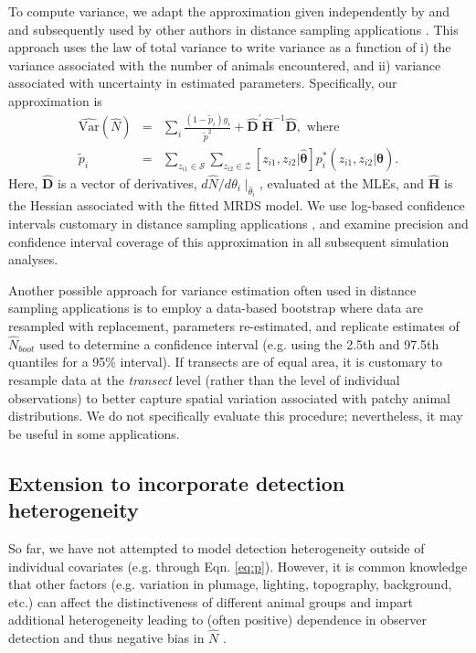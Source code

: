 \documentclass[aoas,preprint]{imsart}
\numberwithin{equation}{section}
\theoremstyle{plain}
\begin{document}
To compute variance, we adapt the approximation given independently by \citet{Huggins1989,Huggins1990} and \citet{Alho1990} and subsequently used by other authors in distance sampling applications \citep[e.g.][]{BorchersEtAl2006}.
This approach uses the law of total variance to write variance as a function of i) the variance associated with the number of animals encountered, and ii) variance associated with uncertainty in estimated parameters.  Specifically, our approximation is
\begin{eqnarray*}
  \hat{\text{Var}}(\hat{N}) & = & \sum_i \frac{(1-\tilde{p}_i)g_i}{\tilde{p}^2}+\hat{\textbf{D}}^\prime \hat{\textbf{H}}^{-1}\hat{\textbf{D}}, \text{ where} \\
  \tilde{p}_i & = & \sum_{z_{i1}\in \mathcal{S}} \sum_{z_{i2} \in \mathcal{Z}} [{z}_{i1},{z}_{i2} | \hat{\boldsymbol{\theta}}]p_i^*(z_{i1},z_{i2}|\hat{\boldsymbol{\theta}}).
\end{eqnarray*}
Here, $\hat{\textbf{D}}$ is a vector of derivatives, $d \hat{N} / d \theta_i \mid_{\hat{\theta}_i}$, evaluated at the MLEs, and $\hat{\textbf{H}}$ is the Hessian associated with the fitted MRDS model. We use log-based confidence intervals \citep[][pg. 212]{BurnhamEtAl1987} customary in distance sampling applications \citep{BucklandEtAl2001}, and examine precision and confidence interval coverage of this approximation in all subsequent simulation analyses.

Another possible approach for variance estimation often used in distance sampling applications is to employ a data-based bootstrap where data are resampled with replacement, parameters re-estimated, and replicate estimates of $\hat{N}_{boot}$ used to determine a confidence interval (e.g. using the 2.5th and 97.5th quantiles for a 95\% interval).  If transects are of equal area, it is customary to resample data at the \textit{transect} level (rather than the level of individual observations) to better capture spatial variation associated with patchy animal distributions.  We do not specifically evaluate this procedure; nevertheless, it may be useful in some applications.


\subsection{Extension to incorporate detection heterogeneity}
\label{section:het}

So far, we have not attempted to model detection heterogeneity outside of individual covariates (e.g. through Eqn. \ref{eq:p}).  However, it is common knowledge that other factors (e.g. variation in plumage, lighting, topography, background, etc.) can affect the distinctiveness of different animal groups and impart additional heterogeneity leading to (often positive) dependence in observer detection and thus negative bias in $\hat{N}$ \citep{LaakeBorchers2004,BucklandEtAl2010,BurtEtAl2014}.
\end{document}
